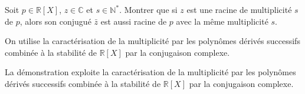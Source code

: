 \documentclass[11pt, a4paper]{article}
\theoremstyle{definition}
\begin{document}
\clearpage

\begin{tcolorbox}[instructionstyle]
Soit $p \in \mathbb{R}[X]$, $z \in \mathbb{C}$ et $s \in \mathbb{N}^*$. Montrer que si $z$ est une racine de multiplicité $s$ de $p$, alors son conjugué $\bar{z}$ est aussi racine de $p$ avec la même multiplicité $s$.
\end{tcolorbox}

\begin{tcolorbox}[methodstyle]
  On utilise la caractérisation de la multiplicité par les polynômes dérivés successifs combinée à la stabilité de $\mathbb{R}[X]$ par la conjugaison complexe.
\end{tcolorbox}

La démonstration exploite la caractérisation de la multiplicité par les polynômes dérivés successifs combinée à la stabilité de $\mathbb{R}[X]$ par la conjugaison complexe.
\end{document}

